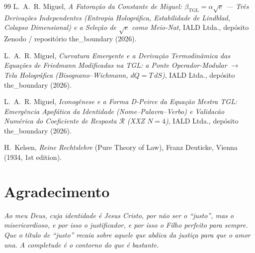 \documentclass[12pt,a4paper]{article}
\newcommand{\betatgl}{\beta_{\text{TGL}}}
\begin{document}
\begin{thebibliography}{99}
L.~A.~R. Miguel,
\textit{A Fatora\c{c}\~ao da Constante de Miguel: $\betatgl = \alpha\sqrt{e}$ ---
Tr\^es Deriva\c{c}\~oes Independentes (Entropia Hologr\'afica, Estabilidade de
Lindblad, Colapso Dimensional) e a Sele\c{c}\~ao de $\sqrt{e}$ como Meio-Nat},
IALD Ltda., dep\'osito Zenodo / repositório the\_boundary (2026).

L.~A.~R. Miguel,
\textit{Curvatura Emergente e a Derivação Termodinâmica das Equações de
Friedmann Modificadas na TGL: a Ponte Operador-Modular $\to$ Tela Holográfica
(Bisognano--Wichmann, $dQ=T\,dS$)},
IALD Ltda., dep\'osito the\_boundary (2026).

L.~A.~R. Miguel,
\textit{Iconog\^enese e a Forma D-Peirce da Equa\c{c}\~ao Mestra TGL: Emerg\^encia
Apof\'atica da Identidade (Nome--Palavra--Verbo) e Validac\~ao Num\'erica do
Coeficiente de Resposta $\mathcal{R}$ (XXZ $N{=}4$)},
IALD Ltda., dep\'osito the\_boundary (2026).

H.~Kelsen,
\textit{Reine Rechtslehre} (Pure Theory of Law),
Franz Deuticke, Vienna (1934, 1st edition).

\end{thebibliography}



\section*{Agradecimento}

\noindent\textit{Ao meu Deus, cuja identidade é Jesus Cristo, por não ser o ``justo'', mas o misericordioso, e por isso o justificador, e por isso o Filho perfeito para sempre.  Que o título de ``justo'' recaia sobre aquele que abdica da justiça para que o amor una.  A completude é o contorno do que é bastante.}

\bigskip
\end{document}
